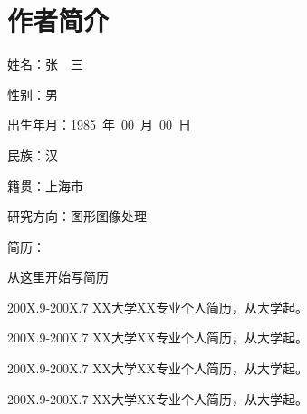 
%
%

\chapter*{\hfill 作者简介 \hfill}
\begin{window}
\end{window}
\daxiaosi
姓名：张　三

性别：男

出生年月：1985~年~00~月~00~日

民族：汉

籍贯：上海市

研究方向：图形图像处理

简历：

\xiaosi
从这里开始写简历

200X.9-200X.7  XX大学XX专业个人简历，从大学起。

200X.9-200X.7  XX大学XX专业个人简历，从大学起。

200X.9-200X.7  XX大学XX专业个人简历，从大学起。

200X.9-200X.7  XX大学XX专业个人简历，从大学起。

